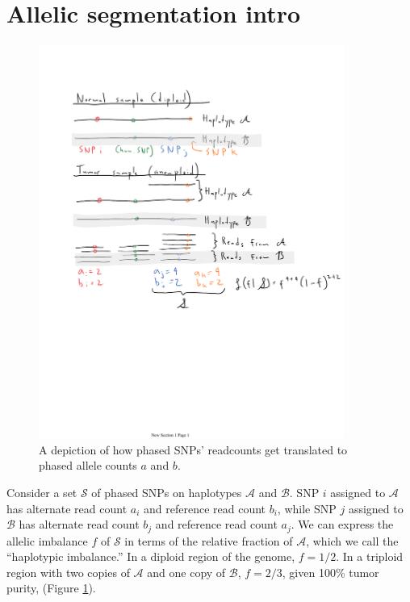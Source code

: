 \documentclass[10pt,letter]{article}
\numberwithin{equation}{section}
\begin{document}
\section{Allelic segmentation intro}

\begin{figure}
\centering
\includegraphics[trim={2cm 9cm 0 3cm},clip,width=10cm]{Figs/fig1.pdf}
\caption{A depiction of how phased SNPs' readcounts get translated to phased allele counts $a$ and $b$.}
\label{introfig}
\end{figure}

Consider a set $\mathcal{S}$ of phased SNPs on haplotypes $\mathcal{A}$ and $\mathcal{B}$. SNP $i$ assigned to $\mathcal{A}$ has alternate read count $a_i$ and reference read count $b_i$, while SNP $j$ assigned to $\mathcal{B}$ has alternate read count $b_j$ and reference read count $a_j$. We can express the allelic imbalance $f$ of $\mathcal{S}$ in terms of the relative fraction of $\mathcal{A}$, which we call the ``haplotypic imbalance.'' In a diploid region of the genome, $f = 1/2$. In a triploid region with two copies of $\mathcal{A}$ and one copy of $\mathcal{B}$, $f = 2/3$, given 100\% tumor purity, (Figure \ref{introfig}).
\end{document}
